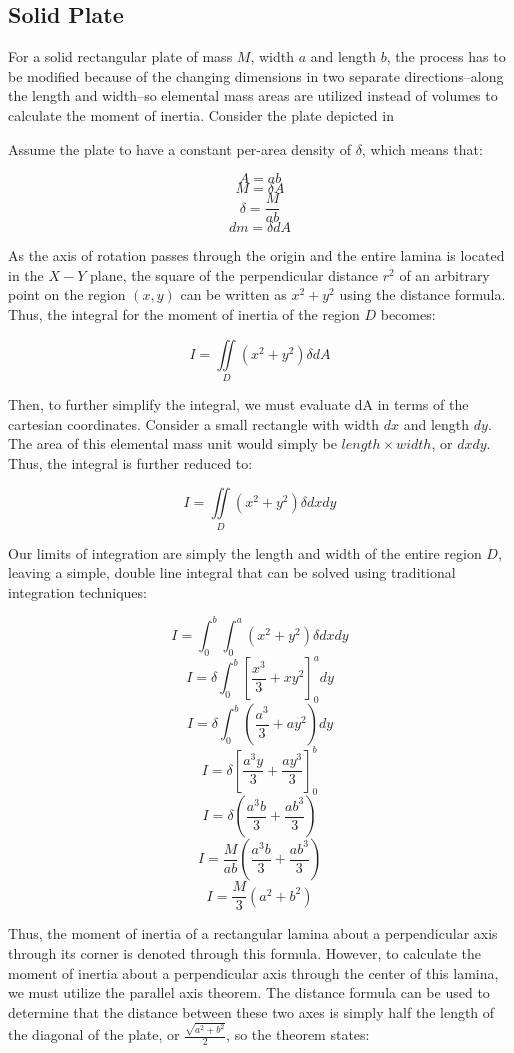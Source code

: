 \subsection{Solid Plate}

For a solid rectangular plate of mass $M$, width $a$ and length $b$, the process has to be modified because of the changing dimensions in two separate directions--along the length and width--so elemental mass areas are utilized instead of volumes to calculate the moment of inertia. Consider the plate depicted in 



Assume the plate to have a constant per-area density of $\delta$, which means that:

\[A = ab\]
\[M = \delta A\]
\[\delta = \frac{M}{ab}\]
\[dm = \delta dA\]


As the axis of rotation passes through the origin and the entire lamina is located in the $X-Y$ plane, the square of the perpendicular distance $r^2$ of an arbitrary point on the region $(x, y)$ can be written as $x^2+y^2$ using the distance formula. Thus, the integral for the moment of inertia of the region $D$ becomes:

\[I = \iint\limits_{D} (x^2+y^2)\delta dA\]

Then, to further simplify the integral, we must evaluate dA in terms of the cartesian coordinates. Consider a small rectangle with width $dx$ and length $dy$. The area of this elemental mass unit would simply be $length \times width$, or $dxdy$. Thus, the integral is further reduced to:

\[I = \iint\limits_{D} (x^2+y^2)\delta dxdy\]

Our limits of integration are simply the length and width of the entire region $D$, leaving a simple, double line integral that can be solved using traditional integration techniques:

\[I = \int_0^b\int_0^a (x^2+y^2)\delta dxdy\]
\[I = \delta\int_0^b\left[\frac{x^3}{3}+xy^2\right]_0^a dy\]
\[I = \delta\int_0^b\left(\frac{a^3}{3}+ay^2\right) dy\]
\[I = \delta\left[\frac{a^3y}{3}+\frac{ay^3}{3}\right]_0^b\]
\[I = \delta\left(\frac{a^3b}{3}+\frac{ab^3}{3}\right)\]
\[I = \frac{M}{ab}\left(\frac{a^3b}{3}+\frac{ab^3}{3}\right)\]
\[I = \frac{M}{3}\left(a^2+b^2\right)\]

Thus, the moment of inertia of a rectangular lamina about a perpendicular axis through its corner is denoted through this formula. However, to calculate the moment of inertia about a perpendicular axis through the center of this lamina, we must utilize the parallel axis theorem. The distance formula can be used to determine that the distance between these two axes is simply half the length of the diagonal of the plate, or $\frac{\sqrt{a^2+b^2}}{2}$, so the theorem states:

